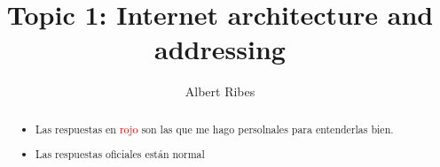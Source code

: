 \documentclass[a4paper,10pt]{article}
\title{Topic 1: Internet architecture and addressing}
\author{Albert Ribes}
\newcommand{\red}[1]{\textcolor{red}{#1}}
\begin{document}
\maketitle

\begin{abstract}
\begin{itemize}
  \item Las respuestas en \red{rojo} son las que me hago persolnales para entenderlas bien.

  \item Las respuestas oficiales están normal
\end{itemize}
\end{abstract}

\end{document}
